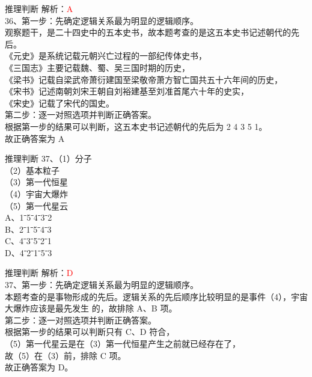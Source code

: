 \documentclass[aspectratio=169]{beamer}
\begin{document}
\begin{frame}[t]{推理判断}
    解析：\textcolor{red}{A}\\
    36、第一步：先确定逻辑关系最为明显的逻辑顺序。\\
    观察题干，是二十四史中的五本史书，故本题考查的是这五本史书记述朝代的先后。\\
    《元史》是系统记载元朝兴亡过程的一部纪传体史书，\\
    《三国志》主要记载魏、蜀、吴三国时期的历史，\\
    《梁书》记载自梁武帝萧衍建国至梁敬帝萧方智亡国共五十六年间的历史，\\
    《宋书》记述南朝刘宋王朝自刘裕建基至刘准首尾六十年的史实，\\
    《宋史》记载了宋代的国史。\\
    第二步：逐一对照选项并判断正确答案。\\
    根据第一步的结果可以判断，这五本史书记述朝代的先后为 2 4 3 5 1。\\
    故正确答案为 A
\end{frame}


\begin{frame}[t]{推理判断}
    37、（1）分子\\
    （2）基本粒子\\
    （3）第一代恒星\\
    （4）宇宙大爆炸\\
    （5）第一代星云\\
    A、1ˉ5ˉ4ˉ3ˉ2\\
    B、2ˉ1ˉ5ˉ4ˉ3\\
    C、4ˉ3ˉ5ˉ2ˉ1\\
    D、4ˉ2ˉ1ˉ5ˉ3\\
\end{frame}


\begin{frame}[t]{推理判断}
    解析：\textcolor{red}{D}\\
    37、第一步：先确定逻辑关系最为明显的逻辑顺序。\\
    本题考查的是事物形成的先后。逻辑关系的先后顺序比较明显的是事件（4），宇宙大爆炸应该是最先发生
    的，故排除 A、B 项。\\
    第二步：逐一对照选项并判断正确答案。\\
    根据第一步的结果可以判断只有 C、D 符合，\\
    （5）第一代星云是在（3）第一代恒星产生之前就已经存在了，\\
    故（5）在（3）前，排除 C 项。\\
    故正确答案为 D。\\
\end{frame}
\end{document}
